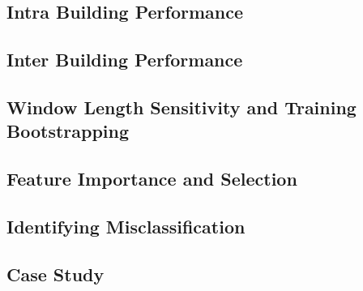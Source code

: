 \subsection{Intra Building Performance}

\subsection{Inter Building Performance}

\subsection{Window Length Sensitivity and Training Bootstrapping}

\subsection{Feature Importance and Selection}

\subsection{Identifying Misclassification}

\subsection{Case Study}
